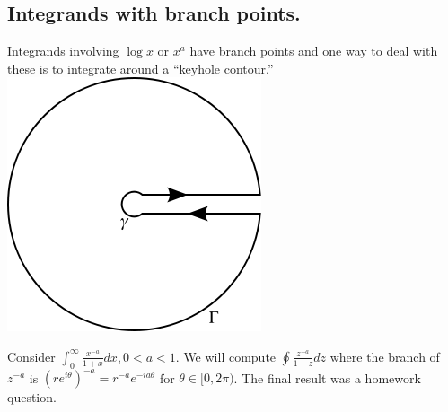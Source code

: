\documentclass[11pt,leqno,oneside]{amsart}
\begin{document}
  \subsection*{Integrands with branch points.}
  Integrands involving $\log x$ or $x^a$ have branch points and one
  way to deal with these is to integrate around a ``keyhole contour.'' \\
  \includegraphics[scale=0.5]{images/keyhole_contour.png} \\
  \begin{example}
    Consider $\int_0^\infty \frac{x^{-a}}{1+x}dx, 0 < a < 1$. We will
    compute $\oint \frac{z^{-a}}{1+z}dz$ where the branch
    of $z^{-a}$ is $(re^{i\theta})^{-a} = r^{-a}e^{-ia\theta}$ for
    $\theta \in [0,2\pi)$. The final result was a homework question.
  \end{example}
\end{document}

